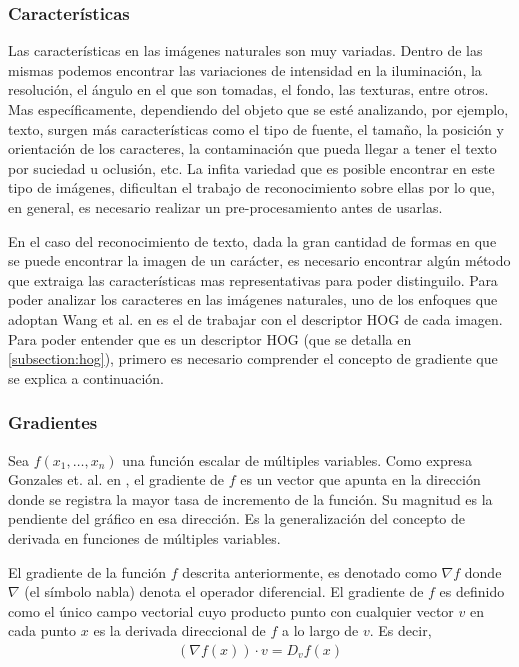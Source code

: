 \subsubsection{Características}

Las características en las imágenes naturales son muy variadas. Dentro de las mismas podemos encontrar las variaciones de intensidad en la iluminación, la resolución, el ángulo en el que son tomadas, el fondo, las texturas, entre otros. Mas específicamente, dependiendo del objeto que se esté analizando, por ejemplo, texto, surgen más características como el tipo de fuente, el tamaño, la posición y orientación de los caracteres, la contaminación que pueda llegar a tener el texto por suciedad u oclusión, etc. La infita variedad que es posible encontrar en este tipo de imágenes, dificultan el trabajo de reconocimiento sobre ellas por lo que, en general, es necesario realizar un pre-procesamiento antes de usarlas.

	En el caso del reconocimiento de texto, dada la gran cantidad de formas en que se puede encontrar la imagen de un carácter, es necesario encontrar algún método que extraiga las características mas representativas para poder distinguilo. Para poder analizar los caracteres en las imágenes naturales, uno de los enfoques que adoptan Wang et al. en \cite{wang} es el de trabajar con el descriptor HOG de cada imagen. Para poder entender que es un descriptor HOG (que se detalla en \ref{subsection:hog}), primero es necesario comprender el concepto de gradiente que se explica a continuación.
	
	
\subsubsection{Gradientes}

Sea $f(x_1,\dots,x_n)$ una función escalar de múltiples variables. Como expresa Gonzales et. al. en \cite{GonWoods}, el gradiente de $f$ es un vector que apunta en la dirección donde se registra la mayor tasa de incremento de la función. Su magnitud es la pendiente del gráfico en esa dirección. Es la generalización del concepto de derivada en funciones de múltiples variables.
		
	El gradiente de la función $f$ descrita anteriormente, es denotado como $\nabla f$ donde $\nabla$ (el símbolo nabla) denota el operador diferencial. El gradiente de $f$ es definido como el único campo vectorial cuyo producto punto con cualquier vector $v$ en cada punto $x$ es la derivada direccional de $f$ a lo largo de $v$. Es decir,
		 \begin{align*}
		 	(\nabla f(x))\cdot v = D_v f(x)
		 \end{align*}
		 
